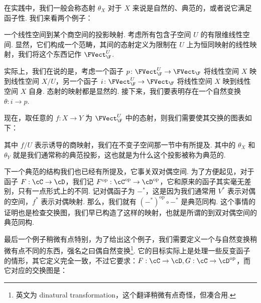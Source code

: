 在实践中，我们一般会称态射 $\theta_X$ 对于 $X$ 来说是自然的、典范的，或者说它满足函子性. 我们来看两个例子：

\begin{example}{}{}
    一个线性空间到某个商空间的投影映射. 考虑所有包含子空间 $U$ 的有限维线性空间. 显然，它们构成一个范畴，其间的态射定义为限制在 $U$ 上为恒同映射的线性映射，我们将这个东西记作 $\FVect_\F^U$.

    实际上，我们在说的是，考虑一个函子 $p\colon \FVect_\F^U \to \FVect_\F$ 将线性空间 $X$ 映到线性空间 $X/U$，另一个函子 $i\colon \FVect_\F^U \to \FVect_\F$ 将线性空间 $X$ 映到线性空间 $X$ 自身. 态射的映射都是显然的. 接下来，我们要表明存在一个自然变换 $\theta: i \to p$.

    现在，取任意的 $f\colon X \to Y$ 为 $\FVect_\F^U$ 中的态射，则我们需要使其交换的图表如下：

    \begin{center}
    \end{center}

    其中 $f/U$ 表示诱导的商映射，我们在不变子空间那一节中有所提及. 其中的 $\theta_X$ 和 $\theta_Y$ 就是我们通常称的典范投影，这也就是为什么这个投影被称为典范的.
\end{example}

下一个典范的结构我们也已经有所提及，它事关双对偶空间. 为了方便起见，对于函子 $F: \cC \to \cD$，我们记 $F^\mathrm{op}: \cC^\mathrm{op} \to \cD^\mathrm{op}$，它和原来的函子其实毫无差别，只有一点形式上的不同. 记对偶函子为 $-^*$，这是因为我们通常用 $V^*$ 表示对偶的空间，$f^*$ 表示对偶映射. 那么，我们就有 $(-^*)^\mathrm{op} \circ -^*$ 是典范同构. 这个事情的证明也是检查交换图，我们早已构造了这样的映射，也就是所谓的到双对偶空间的典范同构.

最后一个例子稍微有点特别，为了给出这个例子，我们需要定义一个与自然变换稍微有点不同的东西，强名之曰偶自然变换\footnote{英文为 dinatural transformation，这个翻译稍微有点奇怪，但凑合用. }. 它的目标实际上是处理一些反变函子的情形，其它定义完全一致，不过它要求：$F: \cC \to \cD, G: \cC \to \cD^\mathrm{op}$，而它对应的交换图是：

\begin{center}
\end{center}

